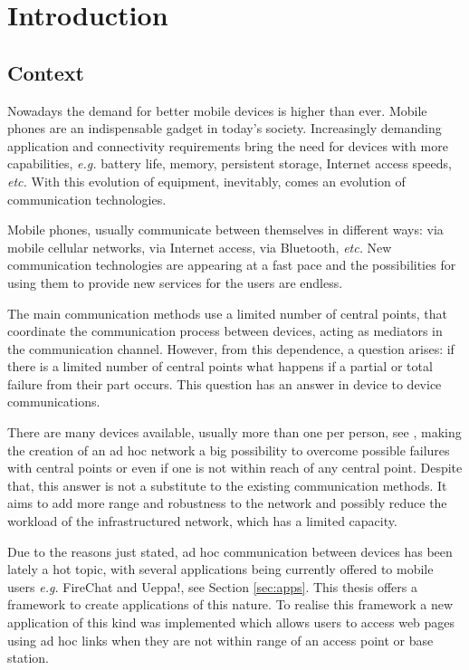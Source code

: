 
\chapter{Introduction}
\label{chapter:introduction}

\section{Context}
Nowadays the demand for better mobile devices is higher than ever. Mobile phones are an indispensable gadget in today's society. Increasingly demanding application and connectivity requirements bring the need for devices with more capabilities, \textit{e.g.} battery life, memory, persistent storage, Internet access speeds, \textit{etc.} With this evolution of equipment, inevitably, comes an evolution of communication technologies.

Mobile phones, usually communicate between themselves in different ways: via mobile cellular networks, via Internet access, via Bluetooth, \textit{etc.} New communication technologies are appearing at a fast pace and the possibilities for using them to provide new services for the users are endless.

The main communication methods use a limited number of central points, that coordinate the communication process between devices, acting as mediators in the communication channel. However, from this dependence, a question arises: if there is a limited number of central points what happens if a partial or total failure from their part occurs. This question has an answer in device to device communications.

There are many devices available, usually more than one per person, see \cite{dpp}, making the creation of an ad hoc network a big possibility to overcome possible failures with central points or even if one is not within reach of any central point. Despite that, this answer is not a substitute to the existing communication methods. It aims to add more range and robustness to the network and possibly reduce the workload of the infrastructured network, which has a limited capacity.

Due to the reasons just stated, ad hoc communication between devices has been lately a hot topic, with several applications being currently offered to mobile users \textit{e.g.} FireChat and Ueppa!, see Section \ref{sec:apps}. This thesis offers a framework to create applications of this nature. To realise this framework a new application of this kind was implemented which allows users to access web pages using ad hoc links when they are not within range of an access point or base station. 

